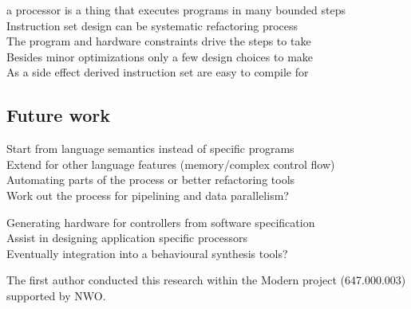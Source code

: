 \documentclass[preprint]{sigplanconf}
\begin{document}
a processor is a thing that executes programs in many bounded steps \\

Instruction set design can be systematic refactoring process \\
The program and hardware constraints drive the steps to take \\
Besides minor optimizations only a few design choices to make \\
As a side effect derived instruction set are easy to compile for


\subsection{Future work}

Start from language semantics instead of specific programs \\
Extend for other language features (memory/complex control flow) \\
Automating parts of the process or better refactoring tools\\
Work out the process for pipelining and data parallelism? 

Generating hardware for controllers from software specification \\
Assist in designing application specific processors \\
Eventually integration into a behavioural synthesis tools?



\begin{acks}
The first author conducted this research within the Modern project (647.000.003) supported by NWO.
\end{acks}


\end{document}

